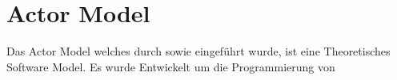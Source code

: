 \chapter{Actor Model}
Das Actor Model welches durch \cite{hewitt1973session} sowie \cite{Agha1985Actors:Systems.} eingeführt wurde, ist eine Theoretisches Software Model. Es wurde Entwickelt um die Programmierung von 